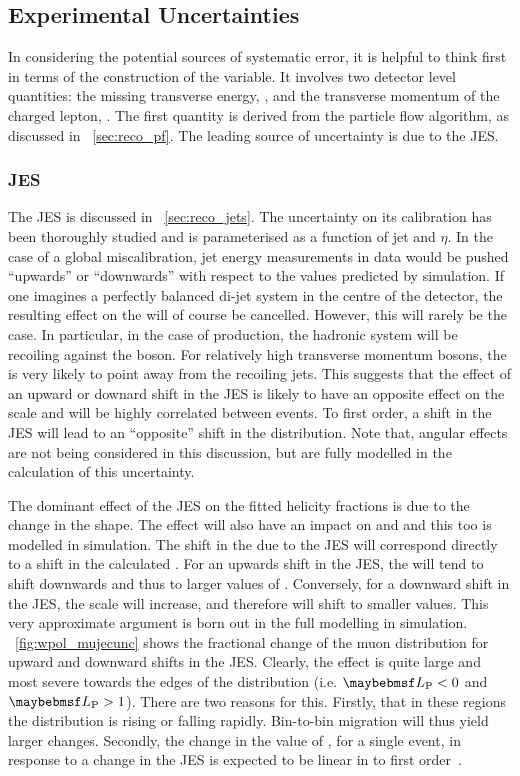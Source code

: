 \subsection{Experimental Uncertainties}
In considering the potential sources of systematic error, it is helpful to think
first in terms of the construction of the \LP variable. It involves two detector
level quantities: the missing transverse energy, \METv, and the transverse
momentum of the charged lepton, \Ptlv. The first quantity is derived from the
particle flow algorithm, as discussed in \sec~\ref{sec:reco_pf}. The leading
source of uncertainty is due to the \ac{JES}.

\subsubsection{\acl{JES}}
\label{sec:wpol_syst_jec}
The \ac{JES} is discussed in \sec~\ref{sec:reco_jets}. The uncertainty on its
calibration has been thoroughly studied and is parameterised as a function of
jet \Pt and $\eta$. In the case of a global miscalibration, jet energy
measurements in data would be pushed ``upwards'' or ``downwards'' with respect
to the values predicted by simulation. If one imagines a perfectly balanced
di-jet system in the centre of the detector, the resulting effect on the \METv
will of course be cancelled. However, this will rarely be the case. In
particular, in the case of \Wjets production, the hadronic system will be
recoiling against the \PW boson. For relatively high transverse momentum \PW
bosons, the \METv is very likely to point away from the recoiling jets. This
suggests that the effect of an upward or downard shift in the \ac{JES} is likely
to have an opposite effect on the \METv scale and will be highly correlated
between events. To first order, a shift in the \ac{JES} will lead to an
``opposite'' shift in the \MET distribution. Note that, angular effects are not
being considered in this discussion, but are fully modelled in the calculation
of this uncertainty.

The dominant effect of the \ac{JES} on the fitted helicity fractions is due to
the change in the \LP shape. The effect will also have an impact on \PtW and \MT
and this too is modelled in simulation. The shift in the \MET due to the
\ac{JES} will correspond directly to a shift in the calculated \LP. For an
upwards shift in the \ac{JES}, the \MET will tend to shift downwards and thus to
larger values of \LP. Conversely, for a downward shift in the \ac{JES}, the \MET
scale will increase, and therefore \LP will shift to smaller values. This very
approximate argument is born out in the full modelling in
simulation. \fig~\ref{fig:wpol_mujecunc} shows the fractional change of the muon
\LP distribution for upward and downward shifts in the \ac{JES}. Clearly, the
effect is quite large and most severe towards the edges of the \LP distribution
(i.e. $\LP < 0$ and $\LP > 1$). There are two reasons for this. Firstly, that in
these regions the \LP distribution is rising or falling rapidly. Bin-to-bin
migration will thus yield larger changes. Secondly, the change in the value of
\LP, for a single event, in response to a change in the \ac{JES} is expected to
be linear in \LP to first order~\cite{susy_ra4_pas}.

